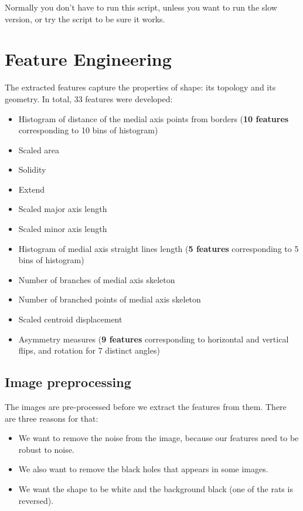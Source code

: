 \documentclass[12pt]{article}
\begin{document}
Normally you don't have to run this script, unless you want to run the slow version, or try the script to be sure it works.

\section{Feature Engineering}

The extracted features capture the properties of shape: its topology and its geometry. In total, 33 features were developed:

\begin{itemize}
	\item Histogram of distance of the medial axis points from borders (\textbf{10 features} corresponding to 10 bins of histogram)
	\item Scaled area
	\item Solidity
	\item Extend
	\item Scaled major axis length
	\item Scaled minor axis length
	\item Histogram of medial axis straight lines length (\textbf{5 features} corresponding to 5 bins of histogram)
	\item Number of branches of medial axis skeleton
	\item Number of branched points of medial axis skeleton
	\item Scaled centroid displacement
	\item Asymmetry measures (\textbf{9 features} corresponding to horizontal and vertical flips, and rotation for 7 distinct angles)
\end{itemize} 

\subsection{Image preprocessing}
The images are pre-processed before we extract the features from them. There are three reasons for that:
\begin{itemize}
	\item We want to remove the noise from the image, because our features need to be robust to noise.
        \item We also want to remove the black holes that appears in some images.
        \item We want the shape to be white and the background black (one of the rats is reversed).
\end{itemize}
\end{document}
